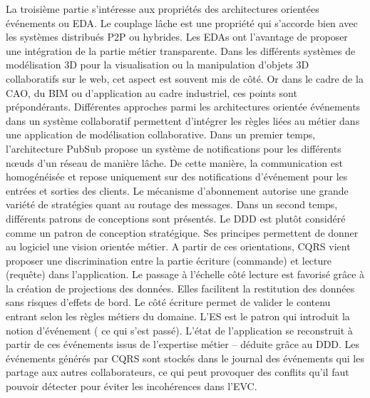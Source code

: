 La troisième partie s'intéresse aux propriétés des architectures orientées 
événements ou \gls{EDA}. Le couplage lâche est une propriété 
qui s'accorde bien avec les systèmes distribués \gls{P2P} ou hybrides. Les 
\glspl{EDA} ont l'avantage de proposer une intégration de la partie métier 
transparente. Dans les différents systèmes de modélisation \gls{3D} pour la 
visualisation ou la manipulation d'objets \gls{3D} collaboratifs sur le web, 
cet aspect est souvent mis de côté. Or dans le cadre de 
la \gls{CAO}, du \gls{BIM} ou d'application au cadre industriel, ces points sont 
prépondérants.
Différentes approches parmi les architectures orientée événements dans un 
système collaboratif permettent d'intégrer les règles liées au métier dans une 
application de modélisation collaborative. Dans un 
premier temps, l'architecture \gls{PubSub} propose un système de notifications 
pour les différents 
n\oe uds d'un réseau de manière lâche. De cette manière, la communication est 
homogénéisée et repose uniquement sur des notifications d'événement pour les 
entrées et sorties des clients. Le mécanisme d'abonnement autorise une 
grande variété de stratégies quant au routage des messages.
Dans un second temps, différents patrons de conceptions sont présentés. Le 
\gls{DDD} est plutôt considéré comme un patron de conception stratégique. Ses 
principes permettent de donner au logiciel une vision orientée métier. 
A partir de ces orientations, \gls{CQRS} vient proposer une discrimination entre la 
partie écriture (commande) et lecture (requête) dans l'application. Le passage à 
l'échelle côté lecture est favorisé grâce à la création de projections des données. Elles facilitent la restitution des données sans risques d'effets de bord. 
Le côté écriture permet de valider le contenu entrant selon les règles métiers du domaine. L'\gls{ES} est le patron qui introduit la notion d'événement (\og 
ce qui s'est passé\fg{}). L'état de l'application se reconstruit à 
partir de ces événements issus de l'expertise métier -- déduite grâce au \gls{DDD}. 
Les événements générés par \gls{CQRS} sont stockés dans le journal des 
événements qui les partage aux autres collaborateurs, ce qui peut 
provoquer des conflits qu'il faut pouvoir détecter pour éviter les incohérences dans 
l'\gls{EVC}. 

